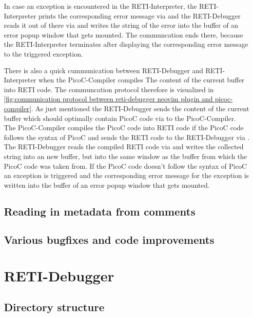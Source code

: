 \documentclass{report}
\begin{document}
In case an exception is encountered in the RETI-Interpreter, the RETI-Interpreter prints the corresponding error message via  and the RETI-Debugger reads it out of there via  and writes the  string of the error into the buffer of an error popup window that gets mounted. The communcation ends there, because the RETI-Interpreter terminates after displaying the corresponding error message to the triggered exception.

There is also a quick cummunication between RETI-Debugger and RETI-Interpreter when the PicoC-Compiler compiles The content of the current buffer into RETI code. The communcation protocol therefore is visualized in \ref{fig:communication protocol between reti-debugger neovim plugin and picoc-compiler}. As just mentioned the RETI-Debugger sends the content of the current buffer which should optimally contain PicoC code via   to the PicoC-Compiler. The PicoC-Compiler compiles the PicoC code into RETI code if the PicoC code follows the syntax of PicoC and sends the RETI code to the RETI-Debugger via . The RETI-Debugger reads the compiled RETI code via  and writes the collected  string into an new buffer, but into the same window as the buffer from which the PicoC code was taken from. If the PicoC code doesn't follow the syntax of PicoC an exception is triggered and the corresponding error message for the exception is written into the buffer of an error popup window that gets mounted.

\section{Reading in metadata from comments}
\label{sec:reading in metadata from comments}

\section{Various bugfixes and code improvements}

\chapter{RETI-Debugger}

\section{Directory structure}
\end{document}
